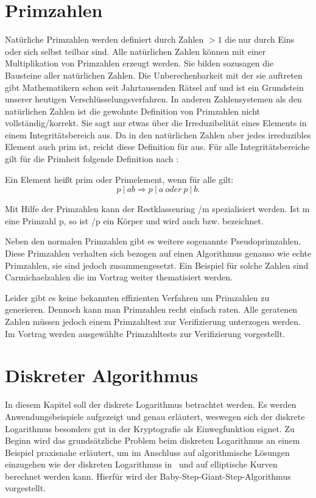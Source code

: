 	\section*{Primzahlen}\label{Kapitel Primzahlen}
		Natürliche Primzahlen werden definiert durch Zahlen $> 1$ die nur durch Eins oder sich selbst teilbar sind. Alle natürlichen Zahlen können mit einer Multiplikation von Primzahlen erzeugt werden. Sie bilden sozusagen die Bausteine aller natürlichen Zahlen. Die Unberechenbarkeit mit der sie auftreten gibt Mathematikern schon seit Jahrtausenden Rätsel auf und ist ein Grundstein unserer heutigen Verschlüsselungsverfahren.
		In anderen Zahlensystemen als den natürlichen Zahlen ist die gewohnte Definition von Primzahlen nicht vollständig/korrekt. Sie sagt nur etwas über die Irreduzibelität eines Elements in einem Integritätsbereich aus. Da in den natürlichen Zahlen aber jedes irreduzibles Element auch prim ist, reicht diese Definition für  aus.
		Für alle Integritätsbereiche gilt für die Primheit folgende Definition nach \cite{Algorithmische:Zahlentheorie}:
			
		Ein Element  heißt prim oder Primelement, wenn für alle  gilt:	
		\begin{displaymath}
			p~|~ab \Longrightarrow p~|~a~oder~p~|~b.
		\end{displaymath}
			
		\wup Mit Hilfe der Primzahlen kann der Restklassenring /m spezialisiert werden. Ist m eine Primzahl p, so ist /p ein Körper und wird auch  bzw.  bezeichnet.
			
		\wup Neben den normalen Primzahlen gibt es weitere sogenannte Pseudoprimzahlen. Diese Primzahlen verhalten sich bezogen auf einen Algorithmus genauso wie echte Primzahlen, sie sind jedoch zusammengesetzt. Ein Beispiel für solche Zahlen sind Carmichaelzahlen die im Vortrag weiter thematisiert werden.
			
		\wup Leider gibt es keine bekannten effizienten Verfahren um Primzahlen zu generieren. Dennoch kann man Primzahlen recht einfach raten. Alle geratenen Zahlen müssen jedoch einem Primzahltest zur Verifizierung unterzogen werden. Im Vortrag werden ausgewählte Primzahltests zur Verifizierung vorgestellt.
		
	\section*{Diskreter Algorithmus}
		\wup In diesem Kapitel soll der diskrete Logarithmus betrachtet werden. Es werden Anwendungsbeispiele aufgezeigt und genau erläutert, weswegen sich der diskrete Logarithmus besonders gut in der Kryptografie als Einwegfunktion eignet. Zu Beginn wird das grundsätzliche Problem beim diskreten Logarithmus an einem Beispiel praxisnahe erläutert, um im Anschluss auf algorithmische Lösungen einzugehen wie der diskreten Logarithmus in \myZPStern~und auf elliptische Kurven berechnet werden kann. Hierfür wird der Baby-Step-Giant-Step-Algorithmus vorgestellt.
	
